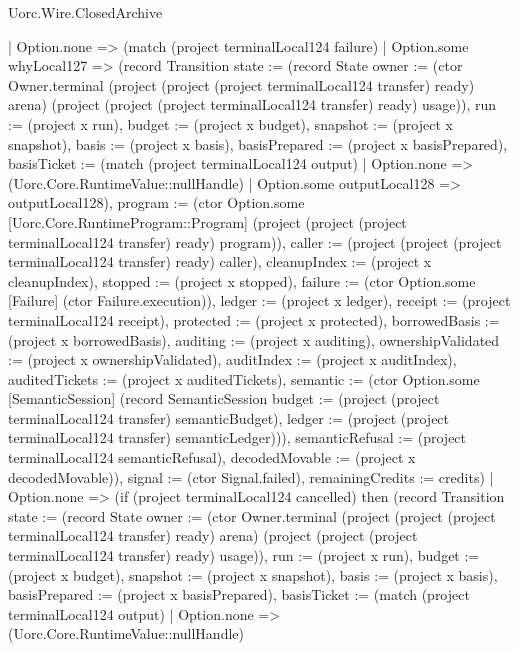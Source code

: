 \begin{lexlean}{Uorc.Wire.ClosedArchive}
\begin{semanticmodule}
{        | Option.none => (match (project terminalLocal124 failure)
          | Option.some whyLocal127 => (record Transition {state := (record State {owner := (ctor Owner.terminal (project (project (project terminalLocal124 transfer) ready) arena) (project (project (project terminalLocal124 transfer) ready) usage)), run := (project x run), budget := (project x budget), snapshot := (project x snapshot), basis := (project x basis), basisPrepared := (project x basisPrepared), basisTicket := (match (project terminalLocal124 output)
            | Option.none => (Uorc.Core.RuntimeValue::nullHandle)
            | Option.some outputLocal128 => outputLocal128), program := (ctor Option.some [Uorc.Core.RuntimeProgram::Program] (project (project (project terminalLocal124 transfer) ready) program)), caller := (project (project (project terminalLocal124 transfer) ready) caller), cleanupIndex := (project x cleanupIndex), stopped := (project x stopped), failure := (ctor Option.some [Failure] (ctor Failure.execution)), ledger := (project x ledger), receipt := (project terminalLocal124 receipt), protected := (project x protected), borrowedBasis := (project x borrowedBasis), auditing := (project x auditing), ownershipValidated := (project x ownershipValidated), auditIndex := (project x auditIndex), auditedTickets := (project x auditedTickets), semantic := (ctor Option.some [SemanticSession] (record SemanticSession {budget := (project (project terminalLocal124 transfer) semanticBudget), ledger := (project (project terminalLocal124 transfer) semanticLedger)})), semanticRefusal := (project terminalLocal124 semanticRefusal), decodedMovable := (project x decodedMovable)}), signal := (ctor Signal.failed), remainingCredits := credits})
          | Option.none => (if (project terminalLocal124 cancelled) then (record Transition {state := (record State {owner := (ctor Owner.terminal (project (project (project terminalLocal124 transfer) ready) arena) (project (project (project terminalLocal124 transfer) ready) usage)), run := (project x run), budget := (project x budget), snapshot := (project x snapshot), basis := (project x basis), basisPrepared := (project x basisPrepared), basisTicket := (match (project terminalLocal124 output)
            | Option.none => (Uorc.Core.RuntimeValue::nullHandle)
}}}
\end{semanticmodule}
\end{lexlean}
